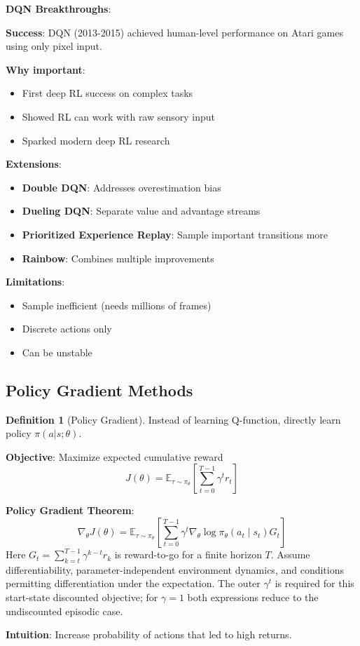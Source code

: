 \documentclass[11pt,twoside]{article}
\numberwithin{equation}{section}
\newcommand{\E}{\mathbb{E}}
\theoremstyle{plain}
\theoremstyle{definition}
\newtheorem{definition}[theorem]{Definition}
\theoremstyle{remark}
\newenvironment{keyidea}{
  \begin{tcolorbox}[colback=yellow!5!white,
                    colframe=yellow!50!black,
                    title=Key Idea,
                    breakable,
                    enhanced,
                    sharp corners,
                    boxrule=0.8pt,
                    left=6pt, right=6pt, top=6pt, bottom=6pt]
}{
  \end{tcolorbox}
}
\begin{document}
\begin{keyidea}
\textbf{DQN Breakthroughs}:

\textbf{Success}: DQN (2013-2015) achieved human-level performance on Atari games using only pixel input.

\textbf{Why important}:
\begin{itemize}
\item First deep RL success on complex tasks
\item Showed RL can work with raw sensory input
\item Sparked modern deep RL research
\end{itemize}

\textbf{Extensions}:
\begin{itemize}
\item \textbf{Double DQN}: Addresses overestimation bias
\item \textbf{Dueling DQN}: Separate value and advantage streams
\item \textbf{Prioritized Experience Replay}: Sample important transitions more
\item \textbf{Rainbow}: Combines multiple improvements
\end{itemize}

\textbf{Limitations}:
\begin{itemize}
\item Sample inefficient (needs millions of frames)
\item Discrete actions only
\item Can be unstable
\end{itemize}
\end{keyidea}

\subsection{Policy Gradient Methods}

\begin{definition}[Policy Gradient]
Instead of learning Q-function, directly learn policy $\pi(a|s; \theta)$.

\textbf{Objective}: Maximize expected cumulative reward
\[
J(\theta)=\E_{\tau\sim\pi_\theta}\left[\sum_{t=0}^{T-1}\gamma^t r_t\right]
\]

\textbf{Policy Gradient Theorem}:
\[
\nabla_\theta J(\theta)=\E_{\tau\sim\pi_\theta}\left[\sum_{t=0}^{T-1}\gamma^t\nabla_\theta\log\pi_\theta(a_t\mid s_t)G_t\right]
\]
Here $G_t=\sum_{k=t}^{T-1}\gamma^{k-t}r_k$ is reward-to-go for a finite horizon $T$. Assume differentiability, parameter-independent environment dynamics, and conditions permitting differentiation under the expectation. The outer $\gamma^t$ is required for this start-state discounted objective; for $\gamma=1$ both expressions reduce to the undiscounted episodic case.

\textbf{Intuition}: Increase probability of actions that led to high returns.
\end{definition}
\end{document}
